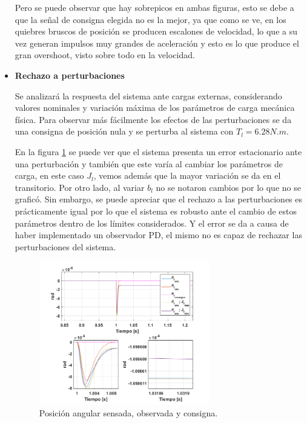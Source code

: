 \documentclass[10pt]{article}
\begin{document}
\begin{itemize}
Pero se puede observar que hay sobrepicos en ambas figuras, esto se debe a que la señal de consigna elegida no es la mejor, ya que como se ve, en los quiebres bruscos de posición se producen escalones de velocidad, lo que a su vez generan impulsos muy grandes de aceleración y esto es lo que produce el gran overshoot, visto sobre todo en la velocidad.

	\item \textbf{Rechazo a perturbaciones}
	
	Se analizará la respuesta del sistema ante cargas externas, considerando valores nominales y variación máxima de los parámetros de carga mecánica física.
	Para observar más fácilmente los efectos de las perturbaciones se da una consigna de posición nula y se perturba al sistema con $T_{l}=6.28 N.m$.
	
	En la figura \ref{fig:perturbaciones} se puede ver que el sistema presenta un error estacionario ante una perturbación y también que este varía al cambiar los parámetros de carga, en este caso $J_{l}$, vemos además que la mayor variación se da en el transitorio. Por otro lado, al variar $b_{l}$ no se notaron cambios por lo que no se graficó. Sin embargo, se puede apreciar que el rechazo a las perturbaciones es prácticamente igual 
	por lo que el sistema es robusto ante el cambio de estos parámetros dentro de los límites considerados.
	Y el error se da a causa de haber implementado un observador PD, el mismo no es capaz de rechazar las perturbaciones del sistema.
	\begin{figure}[h!]
		\centering
		\includegraphics[width=0.7\textwidth]{perturbaciones.png}
		\caption{\label{fig:perturbaciones}Posición angular sensada, observada y consigna.}
		\end{figure}
	\end{itemize}
	\newpage
\end{document}

